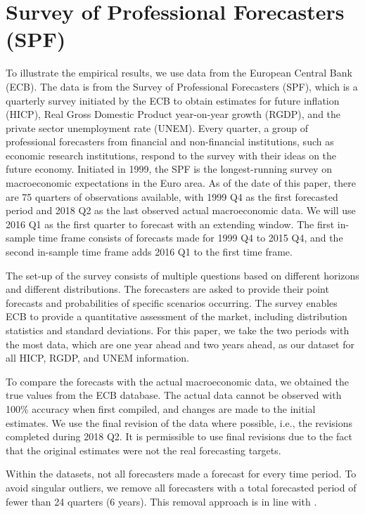 \documentclass[11pt]{article}
\begin{document}
	
	
	\section{Survey of Professional Forecasters (SPF)}\label{survey-of-professional-forecasters-spf}
	
	To illustrate the empirical results, we use data from the European Central Bank (ECB). The data is from the Survey of Professional Forecasters (SPF), which is a quarterly survey initiated by the ECB to obtain estimates for future inflation (HICP), Real Gross Domestic Product year-on-year growth (RGDP), and the private sector unemployment rate (UNEM). Every quarter, a group of professional forecasters from financial and non-financial institutions, such as economic research institutions, respond to the survey with their ideas on the future economy. Initiated in 1999, the SPF is the longest-running survey on macroeconomic expectations in the Euro area. As of the date of this paper, there are 75 quarters of observations available, with 1999 Q4 as the first forecasted period and 2018 Q2 as the last observed actual macroeconomic data. We will use 2016 Q1 as the first quarter to forecast with an extending window. The first in-sample time frame consists of forecasts made for 1999 Q4 to 2015 Q4, and the second in-sample time frame adds 2016 Q1 to the first time frame.
	
	The set-up of the survey consists of multiple questions based on different horizons and different distributions. The forecasters are asked to provide their point forecasts and probabilities of specific scenarios occurring. The survey enables ECB to provide a quantitative assessment of the market, including distribution statistics and standard deviations. For this paper, we take the two periods with the most data, which are one year ahead and two years ahead, as our dataset for all HICP, RGDP, and UNEM information.
	
	To compare the forecasts with the actual macroeconomic data, we obtained the true values from the ECB database. The actual data  cannot be observed with 100\% accuracy when first compiled, and changes are made to the initial estimates. We use the final revision of the data where possible, i.e., the revisions completed during 2018 Q2. It is permissible to use final revisions due to the fact that the original estimates were not the real forecasting targets.
	
	Within the datasets, not all forecasters made a forecast for every time period. To avoid singular outliers, we remove all forecasters with a total forecasted period of fewer than 24 quarters (6 years). This removal approach is in line with \cite{Matsypura2018}.
	
\end{document}
